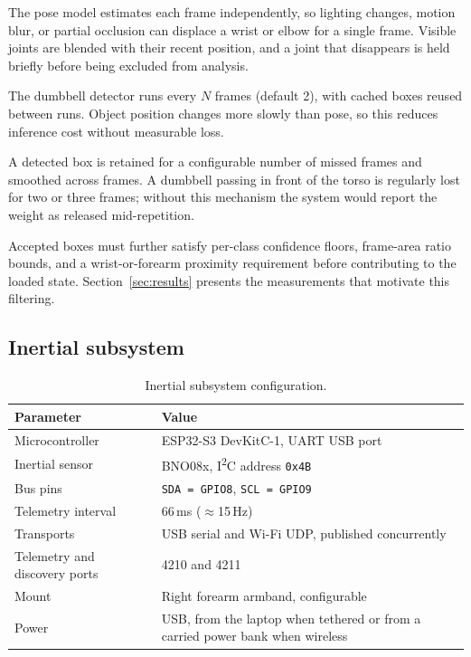 \documentclass[11pt,a4paper]{article}
\newcommand{\code}[1]{\texttt{\small #1}}
\begin{document}
\begin{description}[leftmargin=1.2cm,style=nextline,itemsep=3pt]
\item[Pose smoothing] The pose model estimates each frame independently, so
lighting changes, motion blur, or partial occlusion can displace a wrist or elbow
for a single frame. Visible joints are blended with their recent position, and a
joint that disappears is held briefly before being excluded from analysis.
\item[Strided object inference] The dumbbell detector runs every $N$ frames
(default 2), with cached boxes reused between runs. Object position changes more
slowly than pose, so this reduces inference cost without measurable loss.
\item[Temporal object tracking] A detected box is retained for a configurable
number of missed frames and smoothed across frames. A dumbbell passing in front
of the torso is regularly lost for two or three frames; without this mechanism the
system would report the weight as released mid-repetition.
\end{description}

Accepted boxes must further satisfy per-class confidence floors, frame-area ratio
bounds, and a wrist-or-forearm proximity requirement before contributing to the
loaded state. Section~\ref{sec:results} presents the measurements that motivate
this filtering.

\subsection{Inertial subsystem}

\begin{table}[H]
\centering
\small
\caption{Inertial subsystem configuration.}
\begin{tabularx}{\textwidth}{@{}L{4.6cm} Y@{}}
\toprule
\textbf{Parameter} & \textbf{Value} \\
\midrule
Microcontroller & ESP32-S3 DevKitC-1, UART USB port \\
Inertial sensor & BNO08x, I\textsuperscript{2}C address \code{0x4B} \\
Bus pins & \code{SDA = GPIO8}, \code{SCL = GPIO9} \\
Telemetry interval & 66\,ms ($\approx$15\,Hz) \\
Transports & USB serial and Wi-Fi UDP, published concurrently \\
Telemetry and discovery ports & 4210 and 4211 \\
Mount & Right forearm armband, configurable \\
Power & USB, from the laptop when tethered or from a carried power bank when wireless \\
\bottomrule
\end{tabularx}
\end{table}
\end{document}
